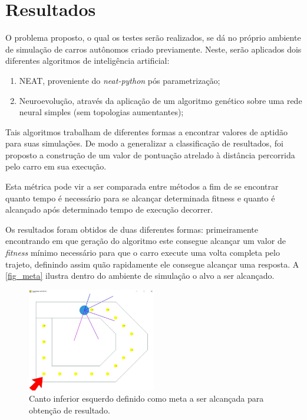 \chapter{Resultados}

O problema proposto, o qual os testes serão realizados, se dá no próprio
ambiente de simulação de carros autônomos criado previamente. Neste, serão
aplicados dois diferentes algoritmos de inteligência artificial:

\begin{enumerate}
	\item NEAT, proveniente do \textit{neat-python} pós parametrização; 
	\item Neuroevolução, através da aplicação de um algoritmo genético sobre uma rede neural simples (sem topologias aumentantes);
\end{enumerate}

Tais algoritmos trabalham de diferentes formas a encontrar valores de aptidão
para suas simulações. De modo a generalizar a classificação de resultados, foi
proposto a construção de um valor de pontua{\c c}{\~a}o atrelado à distância percorrida pelo
carro em sua execução.

Esta métrica pode vir a ser comparada entre métodos a fim de se encontrar
quanto tempo é necessário para se alcançar determinada fitness e quanto é
alcançado após determinado tempo de execução decorrer.

Os resultados foram obtidos de duas diferentes formas: primeiramente
encontrando em que geração do algoritmo este consegue alcançar um valor de
\textit{fitness} mínimo necessário para que o carro execute uma volta completa pelo
trajeto, definindo assim quão rapidamente ele consegue alcançar uma resposta. A
\autoref{fig_meta} ilustra dentro do ambiente de simulação o alvo a ser alcançado.

\begin{figure}[htb]
        \centering
        \caption{\label{fig_meta}Canto inferior esquerdo definido como meta a ser alcançada para obtenção de resultado.}
        \includegraphics[width=0.5\textwidth]{images/meta.png}
\end{figure}

